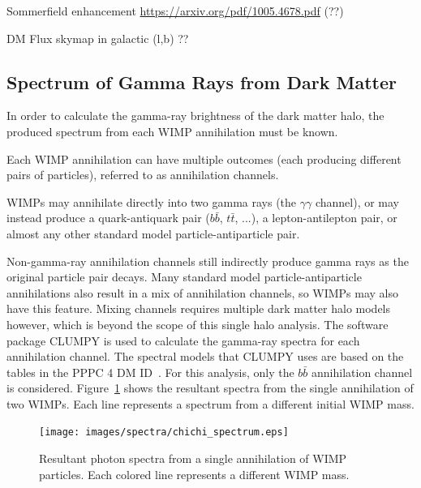     {\color{red}Sommerfield enhancement \url{https://arxiv.org/pdf/1005.4678.pdf} (??)}

    
    {\color{red}DM Flux skymap in galactic (l,b) ??}
    
  \subsection{Spectrum of Gamma Rays from Dark Matter}\label{dm_spectral}
    In order to calculate the gamma-ray brightness of the dark matter halo, the produced spectrum from each WIMP annihilation must be known.

    Each WIMP annihilation can have multiple outcomes (each producing different pairs of particles), referred to as annihilation channels.
    
    WIMPs may annihilate directly into two gamma rays (the $\gamma\gamma$ channel), or may instead produce a quark-antiquark pair ($b\bar{b}$, $t\bar{t}$, ...), a lepton-antilepton pair, or almost any other standard model particle-antiparticle pair.

    Non-gamma-ray annihilation channels still indirectly produce gamma rays as the original particle pair decays.
    Many standard model particle-antiparticle annihilations also result in a mix of annihilation channels, so WIMPs may also have this feature.
    Mixing channels requires multiple dark matter halo models however, which is beyond the scope of this single halo analysis.
    The software package CLUMPY \cite{CLUMPYcode} is used to calculate the gamma-ray spectra for each annihilation channel.
    The spectral models that CLUMPY uses are based on the tables in the PPPC 4 DM ID~\cite{pppc4_dm_spectra}.
    For this analysis, only the $b\bar{b}$ annihilation channel is considered.
    Figure~\ref{fig:chichi_spectrum} shows the resultant spectra from the single annihilation of two WIMPs.
    Each line represents a spectrum from a different initial WIMP mass.

    \begin{figure}[ht]
      \centering
      \texttt{[image: images/spectra/chichi\_spectrum.eps]}
      \caption[Single Annihilation Spectra]{
        Resultant photon spectra from a single annihilation of WIMP particles.
        Each colored line represents a different WIMP mass.}
      \label{fig:chichi_spectrum}
    \end{figure}

